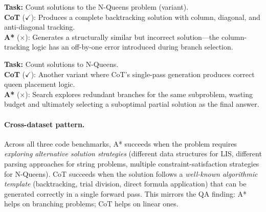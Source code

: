 \documentclass[10pt]{article}
\begin{document}
{\begin{examplebox}[title=CC/14 --- CoT Correct{,} A* Wrong (0.5B)]
\textbf{Task:} Count solutions to the N-Queens problem (variant).\\[4pt]
\textbf{CoT} ($\checkmark$): Produces a complete backtracking solution with column, diagonal, and anti-diagonal tracking.\\[4pt]
\textbf{A*} ($\times$): Generates a structurally similar but incorrect solution---the column-tracking logic has an off-by-one error introduced during branch selection.
\end{examplebox}

\begin{examplebox}[title=CC/24 --- CoT Correct{,} A* Wrong (0.5B)]
\textbf{Task:} Count solutions to N-Queens.\\[4pt]
\textbf{CoT} ($\checkmark$): Another variant where CoT's single-pass generation produces correct queen placement logic.\\[4pt]
\textbf{A*} ($\times$): Search explores redundant branches for the same subproblem, wasting budget and ultimately selecting a suboptimal partial solution as the final answer.
\end{examplebox}

\paragraph{Cross-dataset pattern.}
Across all three code benchmarks, A* succeeds when the problem requires \emph{exploring alternative solution strategies} (different data structures for LIS, different parsing approaches for string problems, multiple constraint-satisfaction strategies for N-Queens). CoT succeeds when the solution follows a \emph{well-known algorithmic template} (backtracking, trial division, direct formula application) that can be generated correctly in a single forward pass. This mirrors the QA finding: A* helps on branching problems; CoT helps on linear ones.

}%
\end{document}
